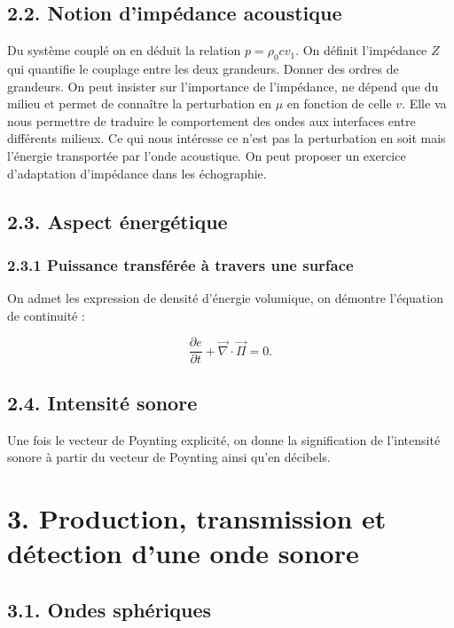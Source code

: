 \documentclass[french, a4paper, 10pt, twocolumn, landscape]{article}
\begin{document}
\subsection*{2.2. Notion d'impédance acoustique}

Du système couplé on en déduit la relation $p=\rho_0 c v_1$. On définit l'impédance $Z$ qui quantifie le couplage entre les deux grandeurs.  Donner des ordres de grandeurs. On peut insister sur l'importance de l'impédance, ne dépend que du milieu et permet de connaître la perturbation en $\mu$ en fonction de celle $v$. Elle va nous permettre de traduire le comportement des ondes aux interfaces entre différents milieux. Ce qui nous intéresse ce n'est pas la perturbation en soit mais l'énergie transportée par l'onde acoustique. On peut proposer un exercice d'adaptation d'impédance dans les échographie.  

\subsection*{2.3. Aspect énergétique}

\subsubsection*{2.3.1 Puissance transférée à travers une surface }

On admet les expression de densité d'énergie volumique, on démontre l'équation de continuité :

\begin{equation}
  \dfrac{\partial e}{\partial t}+\vec{\nabla}\cdot\vec{\Pi}=0.
\end{equation}

\subsection*{2.4. Intensité sonore}

Une fois le vecteur de Poynting explicité, on donne la signification de l'intensité sonore à partir du vecteur de Poynting ainsi qu'en décibels.

\section*{3. Production, transmission et détection d'une onde sonore}

\subsection*{3.1. Ondes sphériques}
\end{document}
